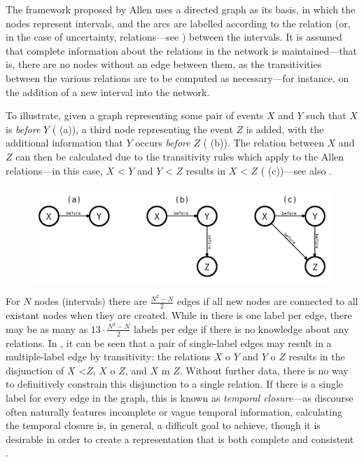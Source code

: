 \documentclass[a4paper,12pt,leqno]{article}
\begin{document}
The framework proposed by Allen uses a directed graph as its basis, in which the nodes represent intervals, and the arcs are labelled according to the relation (or, in the case of uncertainty, relations---see ) between the intervals. It is assumed that complete information about the relations in the network is maintained---that is, there are no nodes without an edge between them, as the transitivities between the various relations are to be computed as necessary---for instance, on the addition of a new interval into the network.

To illustrate, given a graph representing some pair of events $X$ and $Y$ such that $X$ is \textit{before} $Y$ ( (a)), a third node representing the event $Z$ is added, with the additional information that $Y$ occurs \textit{before} $Z$ ( (b)). The relation between $X$ and $Z$ can then be calculated due to the transitivity rules which apply to the Allen relations---in this case, $X$ \textless{} $Y$ and $Y$ \textless{} $Z$ results in $X$ \textless{} $Z$ ( (c))---see also .
\begin{center}
	\begin{figure}[h!]
		\includegraphics[width=\textwidth]{images/simple-transitivity}
		\label{fig:simple-transitivity}
	\end{figure}
\end{center}
For $N$ nodes (intervals) there are $\frac{N^2-N}{2}$ edges if all new nodes are connected to all existant nodes when they are created. While in  there is one label per edge, there may be as many as $13 \cdot \frac{N^2-N}{2}$ labels per edge if there is no knowledge about any relations. In , it can be seen that a pair of single-label edges may result in a multiple-label edge by transitivity: the relations $X$ o $Y$ and $Y$ o $Z$ results in the disjunction of $X$ \textless $Z$, $X$ o $Z$, and $X$ m $Z$. Without further data, there is no way to definitively constrain this disjunction to a single relation. If there is a single label for every edge in the graph, this is known as \textit{temporal closure}---as discourse often naturally features incomplete or vague temporal information, calculating the temporal closure is, in general, a difficult goal to achieve, though it is desirable in order to create a representation that is both complete and consistent \citep{Verhagen2005}.
\end{document}
